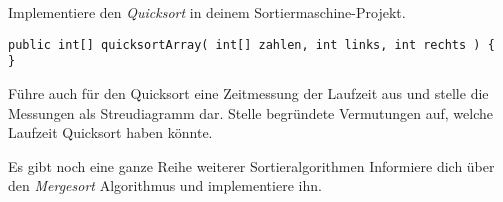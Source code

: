 \documentclass[9pt, a5paper, landscape, ngerman]{arbeitsblatt}
\begin{document}

\begin{aufgabe}[subtitle=Implementierung]
	Implementiere den \emph{Quicksort} in deinem Sortiermaschine-Projekt.
	\begin{verbatim}
public int[] quicksortArray( int[] zahlen, int links, int rechts ) {
}
	\end{verbatim}

\end{aufgabe}

\begin{aufgabe}[subtitle=Laufzeitmessung]
	Führe auch für den Quicksort eine Zeitmessung der Laufzeit aus und stelle die Messungen
	als Streudiagramm dar. Stelle begründete Vermutungen auf, welche Laufzeit Quicksort haben
	könnte.
\end{aufgabe}

\begin{aufgabe*}[subtitle=Mergesort]
	Es gibt noch eine ganze Reihe weiterer Sortieralgorithmen
	Informiere dich über den \emph{Mergesort} Algorithmus und implementiere ihn.
\end{aufgabe*}
\end{document}
